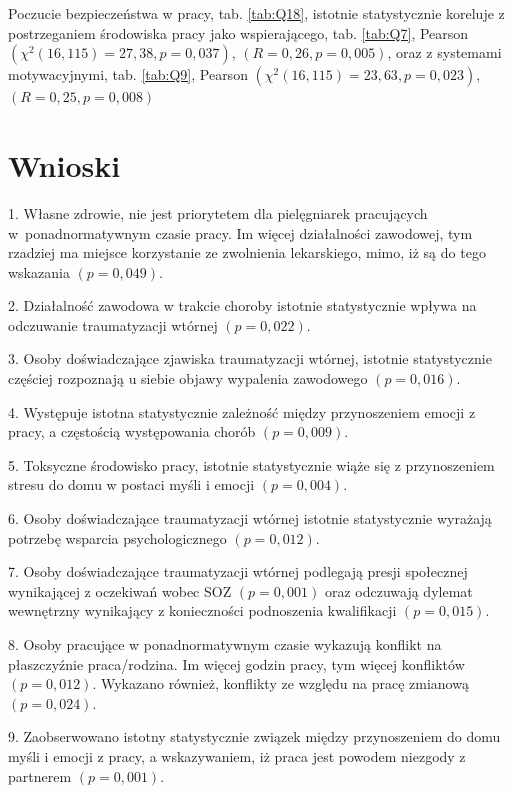 \documentclass[a4paper,12pt,twoside,openright]{mwrep}
\begin{document}
Poczucie bezpieczeństwa w pracy, tab. \ref{tab:Q18}, istotnie statystycznie koreluje z postrzeganiem środowiska pracy jako wspierającego, tab. \ref{tab:Q7}, Pearson $(\chi^2 (16, 115) = 27,38, p = 0,037)$, $(R = 0,26, p = 0,005)$, oraz z systemami motywacyjnymi, tab. \ref{tab:Q9}, Pearson $(\chi^2 (16, 115) = 23,63, p = 0,023)$, $(R = 0,25, p = 0,008)$
	



\vspace{\baselineskip} 


\chapter*{Wnioski}


1. Własne zdrowie, nie jest priorytetem dla pielęgniarek pracujących w~ponadnormatywnym czasie pracy. Im  więcej działalności zawodowej, tym rzadziej  ma miejsce korzystanie ze zwolnienia lekarskiego, mimo, iż są do tego wskazania $( p=0,049)$.

2. Działalność zawodowa w trakcie choroby istotnie statystycznie wpływa na odczuwanie traumatyzacji wtórnej $(p = 0,022)$.

3.  Osoby doświadczające zjawiska traumatyzacji wtórnej,  istotnie statystycznie częściej rozpoznają u siebie objawy wypalenia zawodowego $( p=0,016)$.

4. Występuje  istotna statystycznie zależność między przynoszeniem emocji z pracy, a częstością występowania chorób $(p=0,009)$.

5. Toksyczne środowisko pracy, istotnie statystycznie wiąże się z przynoszeniem stresu do domu w postaci myśli i emocji $( p = 0,004)$.

6. Osoby doświadczające traumatyzacji wtórnej istotnie statystycznie wyrażają potrzebę wsparcia psychologicznego $(p = 0,012)$.

7. Osoby doświadczające traumatyzacji wtórnej podlegają presji społecznej  wynikającej z oczekiwań wobec SOZ $(p = 0,001)$ oraz odczuwają dylemat wewnętrzny wynikający z konieczności podnoszenia kwalifikacji $ (p = 0,015)$.

8. Osoby pracujące w ponadnormatywnym czasie wykazują konflikt na płaszczyźnie praca/rodzina. Im więcej godzin pracy, tym więcej konfliktów $( p=0,012)$.  Wykazano również, konflikty ze względu na pracę zmianową $(p = 0,024)$.

9. Zaobserwowano istotny statystycznie związek między przynoszeniem do domu myśli i emocji z pracy, a wskazywaniem, iż praca jest powodem niezgody z partnerem $(p = 0,001)$.
\end{document}
